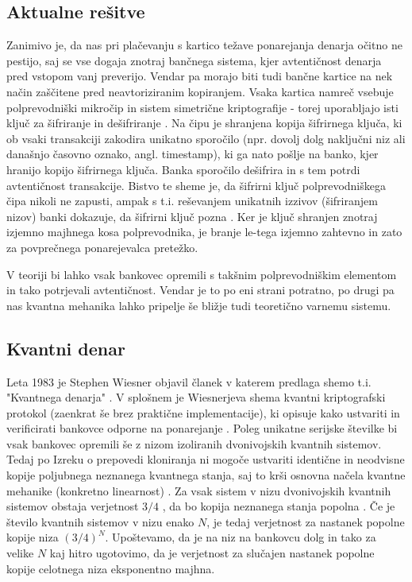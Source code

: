 \documentclass[12pt]{article}
\begin{document}
\subsection{Aktualne rešitve}
	
\par Zanimivo je, da nas pri plačevanju s kartico težave ponarejanja denarja očitno ne pestijo, saj se vse dogaja znotraj bančnega sistema, kjer avtentičnost denarja pred vstopom vanj preverijo. Vendar pa morajo biti tudi bančne kartice na nek način zaščitene pred neavtoriziranim kopiranjem. Vsaka kartica namreč vsebuje polprevodniški mikročip in sistem simetrične kriptografije - torej uporabljajo isti ključ za šifriranje in dešifriranje \cite{CS101IntroductionComputing}. Na čipu je shranjena kopija šifrirnega ključa, ki ob vsaki transakciji zakodira unikatno sporočilo (npr. dovolj dolg naključni niz ali današnjo časovno oznako, angl. timestamp), ki ga nato pošlje na banko, kjer hranijo kopijo šifrirnega ključa. Banka sporočilo dešifrira in s tem potrdi avtentičnost transakcije. Bistvo te sheme je, da šifrirni ključ polprevodniškega čipa nikoli ne zapusti, ampak s t.i. reševanjem unikatnih izzivov (šifriranjem nizov) banki dokazuje, da šifrirni ključ pozna \cite{CS101IntroductionComputing}. Ker je ključ shranjen znotraj izjemno majhnega kosa polprevodnika, je branje le-tega izjemno zahtevno \cite{christopheDescramblingDataReading2006} in zato za povprečnega ponarejevalca pretežko.
\par
V teoriji bi lahko vsak bankovec opremili s takšnim polprevodniškim elementom in tako potrjevali avtentičnost. Vendar je to po eni strani potratno, po drugi pa nas kvantna mehanika lahko pripelje še bližje tudi teoretično varnemu sistemu. 

\subsection{Kvantni denar}

Leta 1983 je Stephen Wiesner objavil članek v katerem predlaga shemo t.i. "Kvantnega denarja" \cite{wiesnerConjugateCoding1983}. V splošnem je Wiesnerjeva shema kvantni kriptografski protokol (zaenkrat še brez praktične implementacije), ki opisuje kako ustvariti in verificirati bankovce odporne na ponarejanje \cite{QuantumMoney2022}. Poleg unikatne serijske številke bi vsak bankovec opremili še z nizom izoliranih dvonivojskih kvantnih sistemov. Tedaj po Izreku o prepovedi kloniranja ni mogoče ustvariti identične in neodvisne kopije poljubnega neznanega kvantnega stanja, saj to krši osnovna načela kvantne mehanike (konkretno linearnost) \cite{NocloningTheorem2022}. Za vsak sistem v nizu dvonivojskih kvantnih sistemov obstaja verjetnost $3/4$ \cite{molinaOptimalCounterfeitingAttacks2012}, da bo kopija  neznanega stanja popolna \cite{QuantumMoney2022}. Če je število kvantnih sistemov v nizu enako $N$, je tedaj verjetnost za nastanek popolne kopije niza $(3/4)^N$. Upoštevamo, da je na niz na bankovcu dolg in tako za velike $N$ kaj hitro ugotovimo, da je verjetnost za slučajen nastanek popolne kopije celotnega niza eksponentno majhna. 
\end{document}
